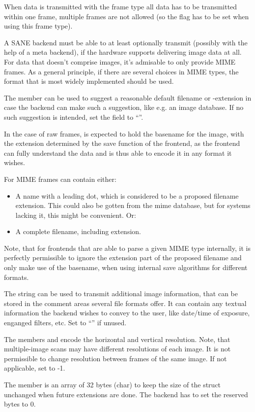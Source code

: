 \documentclass[11pt,DVIps]{report}
\begin{document}
\begin{changebar}
\begin{itemize}
When data is transmitted with the frame type 
all data has to be transmitted within one frame, multiple frames
are not allowed (so the flag  has to be set
when using this frame type).

A SANE backend must be able to at least optionally transmit
 (possibly with the help of a meta backend), if the
hardware supports delivering image data at all. For data that doesn't
comprise images, it's admisable to only provide MIME frames. As a
general principle, if there are several choices in MIME types, the
format that is most widely implemented should be used.
\end{itemize}

The member  can be used to suggest a reasonable 
default filename or -extension in case the backend can make such a 
suggestion, like e.g. an image database. 
If no such suggestion is intended, set the field to ``''. 

In the case of raw frames,  is expected to hold
the basename for the image, with the extension determined by the save function
of the frontend, as the frontend can fully understand the data and is thus
able to encode it in any format it wishes.

For MIME frames  can contain either: 

\begin{itemize}
\item
A name with a leading dot, which is considered to be a proposed 
filename extension. This could also be gotten from the mime database, 
but for systems lacking it, this might be convenient. Or: 

\item
A complete filename, including extension. 
\end{itemize}

Note, that for frontends that are able to parse a given MIME type 
internally, it is perfectly permissible to ignore the extension 
part of the proposed filename and only make use of the basename, 
when using internal save algorithms for different formats. 

The string  can be used to transmit additional 
image information, that can be stored in the comment areas several file formats 
offer. It can contain any textual information the backend wishes to 
convey to the user, like date/time of exposure, enganged filters, 
etc. Set to ``'' if unused.

The members  and  encode the horizontal and vertical
resolution. Note, that multiple-image scans may have different resolutions of
each image. It is not permissible to change resolution between frames of the
same image. If not applicable, set to -1.

The member  is an array of 32 bytes (char) to keep
the size of the struct unchanged when future extensions are done.
The backend has to set the reserved bytes to 0.
\end{changebar}
\end{document}
